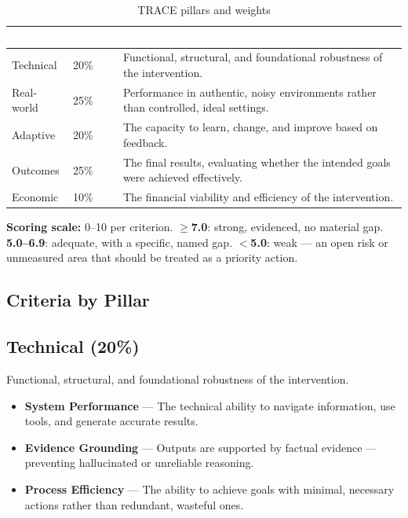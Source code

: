 \documentclass[12pt, a4paper]{article}
\begin{document}
\begin{table}[H]
\centering
\caption{TRACE pillars and weights}
\label{tab:pillars}
\small
{}
\begin{tabularx}{\linewidth}{L{2.6cm} C{1.6cm} X}
\toprule
{}
\textcolor{white}{\textbf{Pillar}} &
\textcolor{white}{\textbf{Weight}} &
\textcolor{white}{\textbf{What it measures}} \\
\midrule
Technical & 20\% & Functional, structural, and foundational robustness of the intervention. \\
Real-world & 25\% & Performance in authentic, noisy environments rather than controlled, ideal settings. \\
Adaptive & 20\% & The capacity to learn, change, and improve based on feedback. \\
Outcomes & 25\% & The final results, evaluating whether the intended goals were achieved effectively. \\
Economic & 10\% & The financial viability and efficiency of the intervention. \\
\bottomrule
\end{tabularx}
\end{table}

\begin{mdframed}[style=mitigbox]
\textbf{Scoring scale:} 0--10 per criterion. \textbf{$\geq$7.0}: strong,
evidenced, no material gap. \textbf{5.0--6.9}: adequate, with a specific,
named gap. \textbf{$<$5.0}: weak --- an open risk or unmeasured area that
should be treated as a priority action.
\end{mdframed}

\subsection*{Criteria by Pillar}

\subsection{Technical (20\%)}
Functional, structural, and foundational robustness of the intervention.
\begin{itemize}[noitemsep]
  \item \textbf{System Performance} --- The technical ability to navigate information, use tools, and generate accurate results.
  \item \textbf{Evidence Grounding} --- Outputs are supported by factual evidence — preventing hallucinated or unreliable reasoning.
  \item \textbf{Process Efficiency} --- The ability to achieve goals with minimal, necessary actions rather than redundant, wasteful ones.
\end{itemize}
\end{document}
